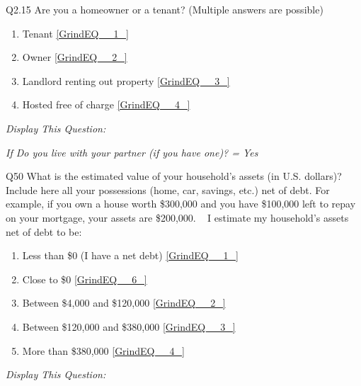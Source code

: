 \documentclass{article} %
\begin{document}
\noindent 

\noindent 

\noindent 

\noindent Q2.15 Are you a homeowner or a tenant? (Multiple answers are possible)

\begin{enumerate}
\item  Tenant  \eqref{GrindEQ__1_} 

\item  Owner  \eqref{GrindEQ__2_} 

\item  Landlord renting out property  \eqref{GrindEQ__3_} 

\item  Hosted free of charge  \eqref{GrindEQ__4_} 
\end{enumerate}

\noindent 

\noindent 

\noindent \textit{Display This Question:}

\textit{If Do you live with your partner (if you have one)? = Yes}

\noindent 

\noindent Q50 What is the\textbf{ }estimated\textbf{ }value\textbf{ }of\textbf{ }your\textbf{ }household's assets (in U.S. dollars)?  ~  Include here all your possessions (home, car, savings, etc.) net of debt. For example, if you own a house worth \$300,000 and you have \$100,000 left to repay on your mortgage, your assets are \$200,000.  ~ I estimate my household's assets net of debt to be:~ 

\begin{enumerate}
\item  Less than \$0 (I have a net debt)  \eqref{GrindEQ__1_} 

\item  Close to \$0  \eqref{GrindEQ__6_} 

\item  Between \$4,000 and \$120,000  \eqref{GrindEQ__2_} 

\item  Between \$120,000 and \$380,000  \eqref{GrindEQ__3_} 

\item  More than \$380,000  \eqref{GrindEQ__4_} 
\end{enumerate}

\noindent 

\noindent 

\noindent \textit{Display This Question:}
\end{document}
